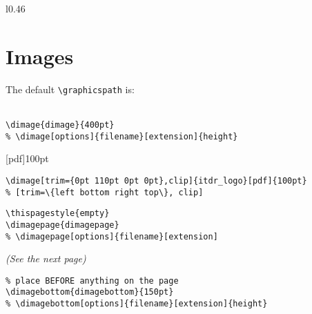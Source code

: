 \documentclass[itdr]{subfiles}
\begin{document}
\skipline
\lipsum[4]

\begin{wrap}[15]{l}{0.46\linewidth}
\end{wrap}

\skipline
\lipsum[5]

\vfill
\clearpage


\section{Images}


\break

The default \lstinline!\graphicspath! is:\\
\\

\vspace{-0.5ex}
\begin{lstlisting}
\dimage{dimage}{400pt}
% \dimage[options]{filename}[extension]{height}
\end{lstlisting}
\faHandPointLeft

\vfill

[pdf]{100pt}
\faHandPointUp
\begin{lstlisting}
\dimage[trim={0pt 110pt 0pt 0pt},clip]{itdr_logo}[pdf]{100pt}
% [trim=\{left bottom right top\}, clip]
\end{lstlisting}

\vfill

\begin{lstlisting}
\thispagestyle{empty}
\dimagepage{dimagepage}
% \dimagepage[options]{filename}[extension]
\end{lstlisting}
{\em (See the next page)}\hfill\faHandPointRight

\vfill

\begin{lstlisting}
% place BEFORE anything on the page
\dimagebottom{dimagebottom}{150pt}
% \dimagebottom[options]{filename}[extension]{height}
\end{lstlisting}
\faHandPointDown
\vspace{-3.5ex}

\break

\thispagestyle{empty}
\end{document}
